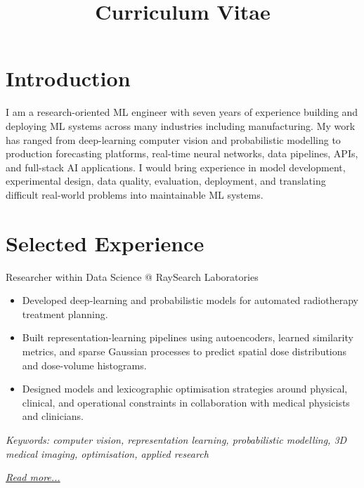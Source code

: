 \documentclass[11pt,a4paper]{moderncv}
\title{Curriculum Vitae}
\begin{document}
\makecvtitle

\section*{Introduction}

I am a research-oriented ML engineer with seven years of experience building and deploying ML systems across many industries including manufacturing.
\newline\hspace*{2em}
My work has ranged from deep-learning computer vision and probabilistic modelling to production forecasting platforms, real-time neural networks, data pipelines, APIs, and full-stack AI applications.
\newline\hspace*{2em}
I would bring experience in model development, experimental design, data quality, evaluation, deployment, and translating difficult real-world problems into maintainable ML systems.

\section{Selected Experience}

\large{Researcher within Data Science @ RaySearch Laboratories}
\normalsize
\begin{itemize}
    \item Developed deep-learning and probabilistic models for automated radiotherapy treatment planning.
    \item Built representation-learning pipelines using autoencoders, learned similarity metrics, and sparse Gaussian processes to predict spatial dose distributions and dose-volume histograms.
    \item Designed models and lexicographic optimisation strategies around physical, clinical, and operational constraints in collaboration with medical physicists and clinicians.
\end{itemize}

{\footnotesize\textit{Keywords: computer vision, representation learning, probabilistic modelling, 3D medical imaging, optimisation, applied research}}

\hfill{\small{\textit{\hyperref[sec:raysearch]{Read more...}}}}
\end{document}
